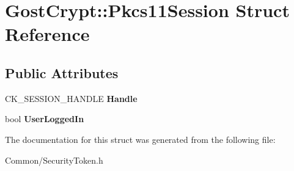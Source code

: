 \hypertarget{struct_gost_crypt_1_1_pkcs11_session}{}\section{Gost\+Crypt\+:\+:Pkcs11\+Session Struct Reference}
\label{struct_gost_crypt_1_1_pkcs11_session}
\subsection*{Public Attributes}
\begin{DoxyCompactItemize}
\item 
\mbox{\label{struct_gost_crypt_1_1_pkcs11_session_aa7375ed57355136f87e6def02b12250a}} 
C\+K\+\_\+\+S\+E\+S\+S\+I\+O\+N\+\_\+\+H\+A\+N\+D\+LE {\bfseries Handle}
\item 
\mbox{\label{struct_gost_crypt_1_1_pkcs11_session_a5c645be18db1efa50dbd58210f4571a1}} 
bool {\bfseries User\+Logged\+In}
\end{DoxyCompactItemize}


The documentation for this struct was generated from the following file\+:\begin{DoxyCompactItemize}
\item 
Common/Security\+Token.\+h\end{DoxyCompactItemize}
